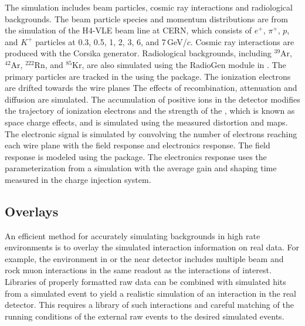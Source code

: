 \documentclass[../main-v1.tex]{subfiles}
\begin{document}
The  simulation includes beam particles, cosmic ray interactions and radiological backgrounds. The beam particle species and momentum distributions are from the  simulation of the H4-VLE beam line at CERN, which consists of $e^{+}$, $\pi^{+}$, $p$, and $K^{+}$ particles at 0.3, 0.5, 1, 2, 3, 6, and 7\,GeV/$c$. Cosmic ray interactions are produced with the Corsika generator. Radiological backgrounds, including $^{39}$Ar, $^{42}$Ar, $^{222}$Rn, and $^{85}$Kr, are also simulated using the RadioGen module in . The primary particles are tracked in the  using the  package. 
The ionization electrons are drifted towards the wire planes %
The effects of recombination, attenuation and diffusion are simulated. The accumulation of positive ions in the detector modifies the trajectory of ionization electrons and the strength of the \efield, which is known as space charge effects, and is simulated using the measured distortion and \efield maps. The electronic signal is simulated by convolving the number of electrons reaching each wire plane with the field response and electronics response. The field response is modeled using the \cite{Veenhof:1998tt} package. 
The electronics response uses the parameterization from a  simulation with the average gain and shaping time measured in the  charge injection system. 




\subsection{Overlays}
An efficient method for accurately simulating backgrounds in high rate environments is to overlay the simulated interaction information on real data.  For example, the environment in  or the near detector includes multiple beam and rock muon interactions in the same readout as %
the interactions of interest.  Libraries of properly formatted raw data can be combined with simulated hits from a simulated event to yield a realistic simulation of an interaction in the real detector. This requires a library of such interactions and careful matching of the running conditions of the external raw events to the desired simulated events. 
\end{document}
